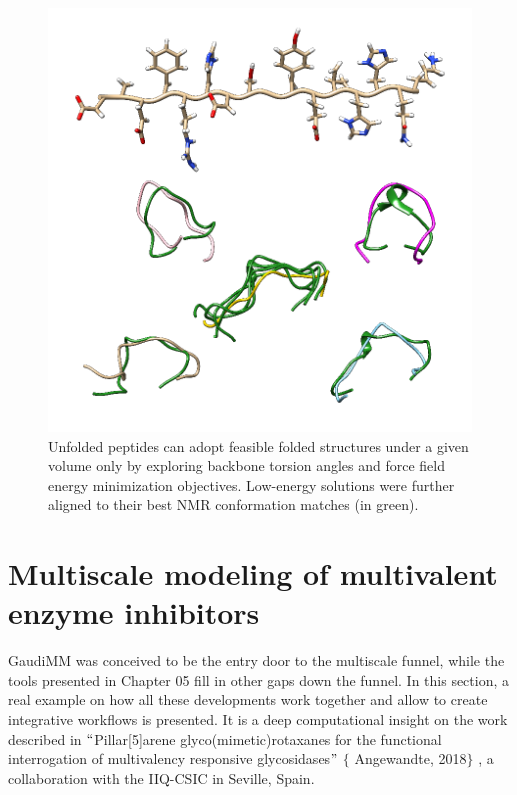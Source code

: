 \begin{figure}[H] %
	\begin{Center}
		\includegraphics[width=\textwidth]{./figures/06/peptide-folding.png}
	\end{Center}
	\caption[Peptide folding]{Unfolded peptides can adopt feasible folded structures under a given volume only by exploring backbone torsion angles and force field energy minimization objectives. Low-energy solutions were further aligned to their best NMR conformation matches (in green).}
	\label{fig:peptide-folding}
\end{figure}




\section{Multiscale modeling of multivalent enzyme inhibitors}
GaudiMM was conceived to be the entry door to the multiscale funnel, while the tools presented in Chapter 05 fill in other gaps down the funnel. In this section, a real example on how all these developments work together and allow to create integrative workflows is presented. It is a deep computational insight on the work described in $``$Pillar[5]arene glyco(mimetic)rotaxanes for the functional interrogation of multivalency responsive glycosidases$"$  $ \{ $ Angewandte, 2018$ \} $ , a collaboration with the IIQ-CSIC in Seville, Spain.

